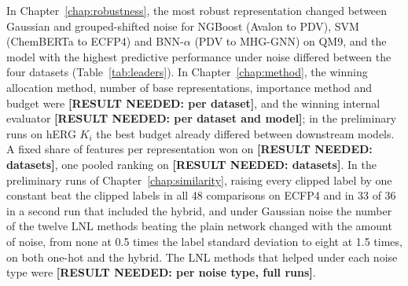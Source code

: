 In Chapter~\ref{chap:robustness}, the most robust representation changed between Gaussian and grouped-shifted noise for NGBoost (Avalon to PDV), SVM (ChemBERTa to ECFP4) and BNN-$\alpha$ (PDV to MHG-GNN) on QM9, and the model with the highest predictive performance under noise differed between the four datasets (Table~\ref{tab:leaders}). In Chapter~\ref{chap:method}, the winning allocation method, number of base representations, importance method and budget were \textbf{[RESULT NEEDED: per dataset]}, and the winning internal evaluator \textbf{[RESULT NEEDED: per dataset and model]}; in the preliminary runs on hERG $K_i$ the best budget already differed between downstream models. A fixed share of features per representation won on \textbf{[RESULT NEEDED: datasets]}, one pooled ranking on \textbf{[RESULT NEEDED: datasets]}. In the preliminary runs of Chapter~\ref{chap:similarity}, raising every clipped label by one constant beat the clipped labels in all 48 comparisons on ECFP4 and in 33 of 36 in a second run that included the hybrid, and under Gaussian noise the number of the twelve LNL methods beating the plain network changed with the amount of noise, from none at 0.5 times the label standard deviation to eight at 1.5 times, on both one-hot and the hybrid. The LNL methods that helped under each noise type were \textbf{[RESULT NEEDED: per noise type, full runs]}.

